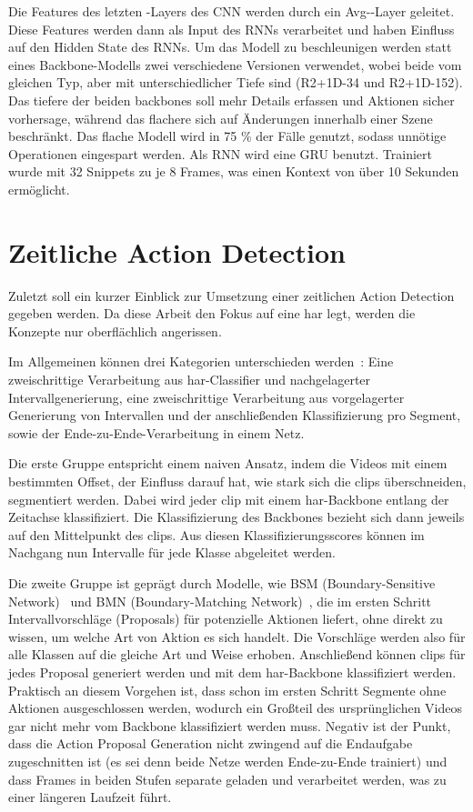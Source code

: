 Die Features des letzten \conv-Layers des CNN werden durch ein Avg-\pool-Layer geleitet.
Diese Features werden dann als Input des RNNs verarbeitet und haben Einfluss auf den Hidden State des RNNs.
Um das Modell zu beschleunigen werden statt eines Backbone-Modells zwei verschiedene Versionen verwendet, wobei beide vom gleichen Typ, aber mit unterschiedlicher Tiefe sind (\zB R2+1D-34 und R2+1D-152).
Das tiefere der beiden backbones soll mehr Details erfassen und Aktionen sicher vorhersage, während das flachere sich auf Änderungen innerhalb einer Szene beschränkt.
Das flache Modell wird in 75 \% der Fälle genutzt, sodass unnötige Operationen eingespart werden.
Als RNN wird eine GRU benutzt.
Trainiert wurde mit 32 Snippets zu je 8 Frames, was einen Kontext von über 10 Sekunden ermöglicht.

\section{Zeitliche Action Detection}
\label{sec:temporal-action-detection}

Zuletzt soll ein kurzer Einblick zur Umsetzung einer zeitlichen Action Detection gegeben werden.
Da diese Arbeit den Fokus auf eine \gls{har} legt, werden die Konzepte nur oberflächlich angerissen.

Im Allgemeinen können drei Kategorien unterschieden werden~\cite{Buch17}:
Eine zweischrittige Verarbeitung aus \gls{har}-Classifier und nachgelagerter Intervallgenerierung, eine zweischrittige Verarbeitung aus vorgelagerter Generierung von Intervallen und der anschließenden Klassifizierung pro Segment, sowie der Ende-zu-Ende-Verarbeitung in einem Netz.

Die erste Gruppe entspricht einem naiven Ansatz, indem die Videos mit einem bestimmten Offset, der Einfluss darauf hat, wie stark sich die \glspl{clip} überschneiden, segmentiert werden.
Dabei wird jeder \gls{clip} mit einem \gls{har}-Backbone entlang der Zeitachse klassifiziert.
Die Klassifizierung des Backbones bezieht sich dann jeweils auf den Mittelpunkt des \glspl{clip}.
Aus diesen Klassifizierungsscores können im Nachgang nun Intervalle für jede Klasse abgeleitet werden.

Die zweite Gruppe ist geprägt durch Modelle, wie BSM (Boundary-Sensitive Network)~\cite{Lin18} und BMN (Boundary-Matching Network)~\cite{Lin19}, die im ersten Schritt Intervallvorschläge (Proposals) für potenzielle Aktionen liefert, ohne direkt zu wissen, um welche Art von Aktion es sich handelt.
Die Vorschläge werden also für alle Klassen auf die gleiche Art und Weise erhoben.
Anschließend können \glspl{clip} für jedes Proposal generiert werden und mit dem \gls{har}-Backbone klassifiziert werden.
Praktisch an diesem Vorgehen ist, dass schon im ersten Schritt Segmente ohne Aktionen ausgeschlossen werden, wodurch ein Großteil des ursprünglichen Videos gar nicht mehr vom Backbone klassifiziert werden muss.
Negativ ist der Punkt, dass die Action Proposal Generation nicht zwingend auf die Endaufgabe zugeschnitten ist (es sei denn beide Netze werden Ende-zu-Ende trainiert) und dass Frames in beiden Stufen separate geladen und verarbeitet werden, was zu einer längeren Laufzeit führt.

